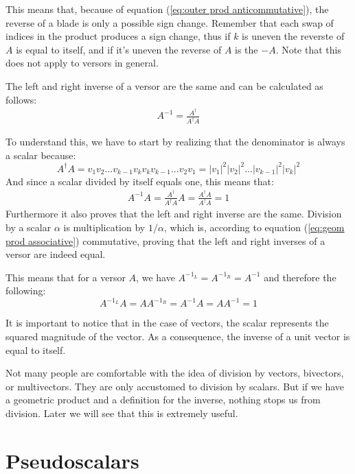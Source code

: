 \documentclass[10pt]{report}
\begin{document}
This means that, because of equation (\ref{eq:outer prod
anticommutative}), the reverse of a blade is only a possible sign
change. Remember that each swap of indices in the product produces
a sign change, thus if $k$ is uneven the reverste of $A$ is equal
to itself, and if it's uneven the reverse of $A$ is the $-A$. Note
that this does not apply to versors in general.

The left and right inverse of a versor are the same and can be
calculated as follows:
\begin{align}
    \label{eq:inverse versor}
    A^{-1} = \frac{A^\dagger}{A^\dagger A}
\end{align}

To understand this, we have to start by realizing that the
denominator is always a scalar because:
\begin{displaymath}
A^\dagger A = v_1v_2...v_{k-1}v_kv_kv_{k-1}...v_2v_1
           = |v_1|^2|v_2|^2...|v_{k-1}|^2|v_k|^2
\end{displaymath}
And since a scalar divided by itself equals one, this means that:
\begin{align*}
    A^{-1}A = \frac{A^\dagger}{A^\dagger A}A = \frac{A^\dagger A}{A^\dagger A}= 1
\end{align*}
Furthermore it also proves that the left and right inverse are the
same. Division by a scalar $\alpha$ is multiplication by
$1/\alpha$, which is, according to equation (\ref{eq:geom prod
associative}) commutative, proving that the left and right
inverses of a versor are indeed equal.

This means that for a versor $A$, we have $A^{-1_{L}} = A^{-1_{R}}
= A^{-1}$ and therefore the following:
\begin{displaymath}
    A^{-1_{L}}A = AA^{-1_{R}} = A^{-1}A = AA^{-1} = 1
\end{displaymath}

It is important to notice that in the case of vectors, the scalar
represents the squared magnitude of the vector. As a consequence,
the inverse of a unit vector is equal to itself.

Not many people are comfortable with the idea of division by
vectors, bivectors, or multivectors. They are only accustomed to
division by scalars. But if we have a geometric product and a
definition for the inverse, nothing stops us from division. Later
we will see that this is extremely useful.

\section{Pseudoscalars}
\end{document}
